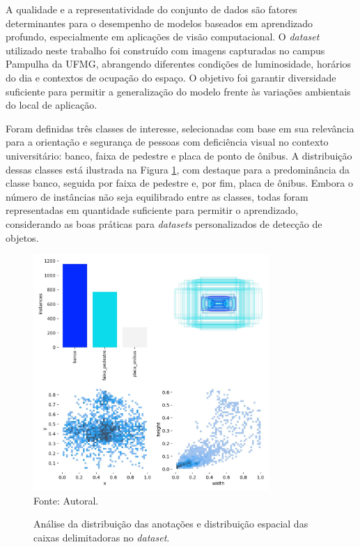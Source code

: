 A qualidade e a representatividade do conjunto de dados são fatores determinantes para o desempenho de modelos baseados em aprendizado profundo, especialmente em aplicações de visão computacional. O \textit{dataset} utilizado neste trabalho foi construído com imagens capturadas no campus Pampulha da UFMG, abrangendo diferentes condições de luminosidade, horários do dia e contextos de ocupação do espaço. O objetivo foi garantir diversidade suficiente para permitir a generalização do modelo frente às variações ambientais do local de aplicação.

Foram definidas três classes de interesse, selecionadas com base em sua relevância para a orientação e segurança de pessoas com deficiência visual no contexto universitário: banco, faixa de pedestre e placa de ponto de ônibus. A distribuição dessas classes está ilustrada na Figura \ref{fg-labels}, com destaque para a predominância da classe banco, seguida por faixa de pedestre e, por fim, placa de ônibus. Embora o número de instâncias não seja equilibrado entre as classes, todas foram representadas em quantidade suficiente para permitir o aprendizado, considerando as boas práticas para \textit{datasets} personalizados de detecção de objetos.

\begin{figure}[htbp]
  \centering
  \caption{Análise da distribuição das anotações e distribuição espacial das caixas delimitadoras no \textit{dataset}.}
  \includegraphics[width=0.8\textwidth]{Figuras/labels.jpg}
  \\
  Fonte: Autoral.
  \label{fg-labels}
\end{figure}

